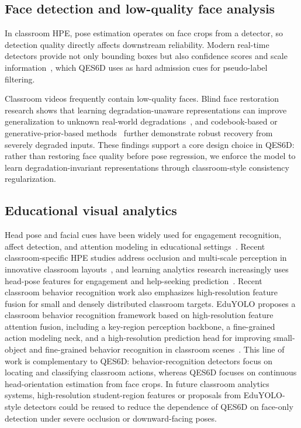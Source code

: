 \documentclass[preprint,12pt]{elsarticle}
\begin{document}
\subsection{Face detection and low-quality face analysis}
In classroom HPE, pose estimation operates on face crops from a detector, so detection quality directly affects downstream reliability. Modern real-time detectors provide not only bounding boxes but also confidence scores and scale information~\cite{wang2024yolov9,wang2024yolov10}, which QES6D uses as hard admission cues for pseudo-label filtering.

Classroom videos frequently contain low-quality faces. Blind face restoration research shows that learning degradation-unaware representations can improve generalization to unknown real-world degradations~\cite{xie2024pltrans}, and codebook-based or generative-prior-based methods~\cite{wang2021gfpgan,wang2022codeformer} further demonstrate robust recovery from severely degraded inputs. These findings support a core design choice in QES6D: rather than restoring face quality before pose regression, we enforce the model to learn degradation-invariant representations through classroom-style consistency regularization.

\subsection{Educational visual analytics}
Head pose and facial cues have been widely used for engagement recognition, affect detection, and attention modeling in educational settings~\cite{whitehill2014faces,bosch2016detecting}. Recent classroom-specific HPE studies address occlusion and multi-scale perception in innovative classroom layouts~\cite{li2025classroompose}, and learning analytics research increasingly uses head-pose features for engagement and help-seeking prediction~\cite{wang2025engagement}. 
Recent classroom behavior recognition work also emphasizes high-resolution feature fusion for small and densely distributed classroom targets. EduYOLO proposes a classroom behavior recognition framework based on high-resolution feature attention fusion, including a key-region perception backbone, a fine-grained action modeling neck, and a high-resolution prediction head for improving small-object and fine-grained behavior recognition in classroom scenes~\cite{eduyolo2026}. This line of work is complementary to QES6D: behavior-recognition detectors focus on locating and classifying classroom actions, whereas QES6D focuses on continuous head-orientation estimation from face crops. In future classroom analytics systems, high-resolution student-region features or proposals from EduYOLO-style detectors could be reused to reduce the dependence of QES6D on face-only detection under severe occlusion or downward-facing poses.
\end{document}
